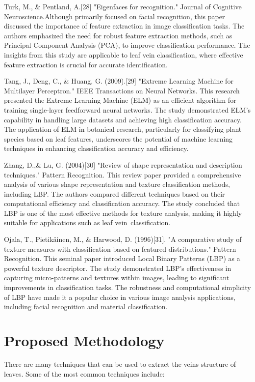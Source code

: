 \documentclass{report}
\begin{document}
{Turk, M., \& Pentland, A.[28] "Eigenfaces for recognition." Journal of Cognitive Neuroscience.Although primarily focused on facial recognition, this paper discussed the importance of feature extraction in image classification tasks. The authors emphasized the need for robust feature extraction methods, such as Principal Component Analysis (PCA), to improve classification performance. The insights from this study are applicable to leaf vein classification, where effective feature extraction is crucial for accurate identification.

Tang, J., Deng, C., \& Huang, G. (2009).[29] "Extreme Learning Machine for Multilayer Perceptron." IEEE Transactions on Neural Networks.
This research presented the Extreme Learning Machine (ELM) as an efficient algorithm for training single-layer feedforward neural networks. The study demonstrated ELM's capability in handling large datasets and achieving high classification accuracy. The application of ELM in botanical research, particularly for classifying plant species based on leaf features, underscores the potential of machine learning techniques in enhancing classification accuracy and efficiency.

Zhang, D.,\& Lu, G. (2004)[30] "Review of shape representation and description techniques." Pattern Recognition.
This review paper provided a comprehensive analysis of various shape representation and texture classification methods, including LBP. The authors compared different techniques based on their computational efficiency and classification accuracy. The study concluded that LBP is one of the most effective methods for texture analysis, making it highly suitable for applications such as leaf vein classification.

Ojala, T., Pietikäinen, M., \& Harwood, D. (1996)[31]. "A comparative study of texture measures with classification based on featured distributions." Pattern Recognition.
This seminal paper introduced Local Binary Patterns (LBP) as a powerful texture descriptor. The study demonstrated LBP's effectiveness in capturing micro-patterns and textures within images, leading to significant improvements in classification tasks. The robustness and computational simplicity of LBP have made it a popular choice in various image analysis applications, including facial recognition and material classification.

\chapter{Proposed Methodology}
There are many techniques that can be used to extract the veins
structure of leaves. Some of the most common techniques include:
}
\end{document}
